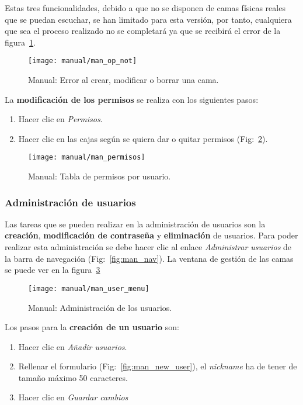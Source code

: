 Estas tres funcionalidades, debido a que no se disponen de camas físicas reales que se puedan escuchar, se han limitado para esta versión, por tanto, cualquiera que sea el proceso realizado no se completará ya que se recibirá el error de la figura~\ref{fig:man_error_no_dis}.

\begin{figure}
	\centering
	\texttt{[image: manual/man\_op\_not]}
	\caption{Manual: Error al crear, modificar o borrar una cama.}
	\label{fig:man_error_no_dis}
\end{figure}

La \textbf{modificación de los permisos} se realiza con los siguientes pasos:
\begin{enumerate}
	\item Hacer clic en \textit{Permisos}.
	\item Hacer clic en las cajas según se quiera dar o quitar permisos (Fig:~\ref{fig:man_perm}).
\end{enumerate}

\begin{figure}
	\centering
	\texttt{[image: manual/man\_permisos]}
	\caption{Manual: Tabla de permisos por usuario.}
	\label{fig:man_perm}
\end{figure}

\subsubsection{Administración de usuarios}

Las tareas que se pueden realizar en la administración de usuarios son la \textbf{creación}, \textbf{modificación de contraseña} y \textbf{eliminación} de usuarios. Para poder realizar esta administración se debe hacer clic al enlace \textit{Administrar usuarios} de la barra de navegación (Fig:~\ref{fig:man_nav}). La ventana de gestión de las camas se puede ver en la figura~\ref{fig:man_menu_usuario}

\begin{figure}
	\centering
	\texttt{[image: manual/man\_user\_menu]}
	\caption{Manual: Administración de los usuarios.}
	\label{fig:man_menu_usuario}
\end{figure}

Los pasos para la \textbf{creación de un usuario} son:
\begin{enumerate}
	\item Hacer clic en \textit{Añadir usuarios}.
	\item Rellenar el formulario (Fig:~\ref{fig:man_new_user}), el \textit{nickname} ha de tener de tamaño máximo 50 caracteres.
	\item Hacer clic en \textit{Guardar cambios}
\end{enumerate}

